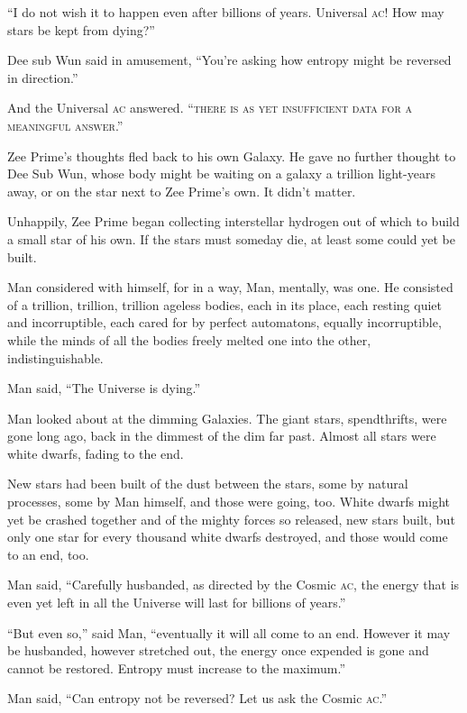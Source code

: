 \enquote{I do not wish it to happen even after billions of years. Universal \textsc{ac}! How may stars be kept from dying?}

Dee sub Wun said in amusement, \enquote{You're asking how entropy might be reversed in direction.}

And the Universal \textsc{ac} answered. \enquote{\textsc{there is as yet insufficient data for a meaningful answer}.}


Zee Prime's thoughts fled back to his own Galaxy. He gave no further thought to Dee Sub Wun, whose body might be waiting on a galaxy a trillion light-years away, or on the star next to Zee Prime's own. It didn't matter.

Unhappily, Zee Prime began collecting interstellar hydrogen out of which to build a small star of his own. If the stars must someday die, at least some could yet be built.

\medskip

Man considered with himself, for in a way, Man, mentally, was one. He consisted of a trillion, trillion, trillion ageless bodies, each in its place, each resting quiet and incorruptible, each cared for by perfect automatons, equally incorruptible, while the minds of all the bodies freely melted one into the other, indistinguishable.

Man said, \enquote{The Universe is dying.}

Man looked about at the dimming Galaxies. The giant stars, spendthrifts, were gone long ago, back in the dimmest of the dim far past. Almost all stars were white dwarfs, fading to the end.

New stars had been built of the dust between the stars, some by natural processes, some by Man himself, and those were going, too. White dwarfs might yet be crashed together and of the mighty forces so released, new stars built, but only one star for every thousand white dwarfs destroyed, and those would come to an end, too.

Man said, \enquote{Carefully husbanded, as directed by the Cosmic \textsc{ac}, the energy that is even yet left in all the Universe will last for billions of years.}

\enquote{But even so,} said Man, \enquote{eventually it will all come to an end. However it may be husbanded, however stretched out, the energy once expended is gone and cannot be restored. Entropy must increase to the maximum.}

Man said, \enquote{Can entropy not be reversed? Let us ask the Cosmic \textsc{ac}.}


